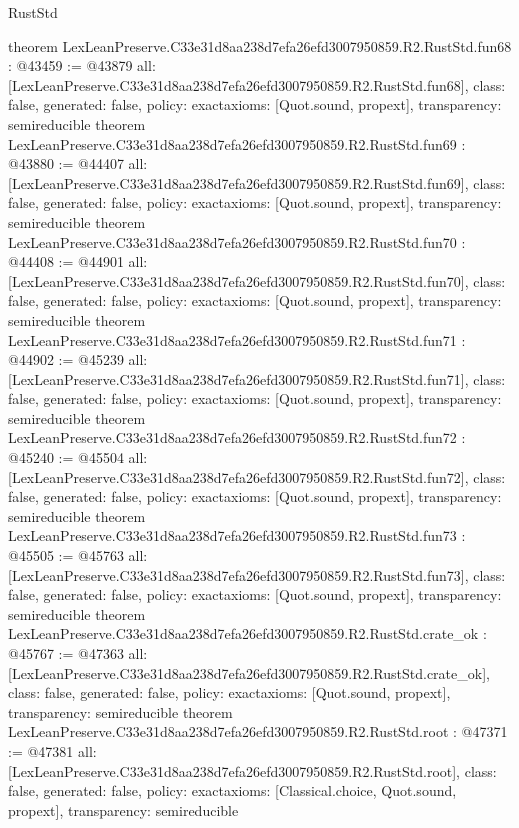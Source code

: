 \begin{lexlean}{RustStd}
\begin{coremodule}
{}
theorem LexLeanPreserve.C33e31d8aa238d7efa26efd3007950859.R2.RustStd.fun68 : @43459 := @43879 {
  all: [LexLeanPreserve.C33e31d8aa238d7efa26efd3007950859.R2.RustStd.fun68],
  class: false,
  generated: false,
  policy: exact{axioms: [Quot.sound, propext]},
  transparency: semireducible
}
theorem LexLeanPreserve.C33e31d8aa238d7efa26efd3007950859.R2.RustStd.fun69 : @43880 := @44407 {
  all: [LexLeanPreserve.C33e31d8aa238d7efa26efd3007950859.R2.RustStd.fun69],
  class: false,
  generated: false,
  policy: exact{axioms: [Quot.sound, propext]},
  transparency: semireducible
}
theorem LexLeanPreserve.C33e31d8aa238d7efa26efd3007950859.R2.RustStd.fun70 : @44408 := @44901 {
  all: [LexLeanPreserve.C33e31d8aa238d7efa26efd3007950859.R2.RustStd.fun70],
  class: false,
  generated: false,
  policy: exact{axioms: [Quot.sound, propext]},
  transparency: semireducible
}
theorem LexLeanPreserve.C33e31d8aa238d7efa26efd3007950859.R2.RustStd.fun71 : @44902 := @45239 {
  all: [LexLeanPreserve.C33e31d8aa238d7efa26efd3007950859.R2.RustStd.fun71],
  class: false,
  generated: false,
  policy: exact{axioms: [Quot.sound, propext]},
  transparency: semireducible
}
theorem LexLeanPreserve.C33e31d8aa238d7efa26efd3007950859.R2.RustStd.fun72 : @45240 := @45504 {
  all: [LexLeanPreserve.C33e31d8aa238d7efa26efd3007950859.R2.RustStd.fun72],
  class: false,
  generated: false,
  policy: exact{axioms: [Quot.sound, propext]},
  transparency: semireducible
}
theorem LexLeanPreserve.C33e31d8aa238d7efa26efd3007950859.R2.RustStd.fun73 : @45505 := @45763 {
  all: [LexLeanPreserve.C33e31d8aa238d7efa26efd3007950859.R2.RustStd.fun73],
  class: false,
  generated: false,
  policy: exact{axioms: [Quot.sound, propext]},
  transparency: semireducible
}
theorem LexLeanPreserve.C33e31d8aa238d7efa26efd3007950859.R2.RustStd.crate_ok : @45767 := @47363 {
  all: [LexLeanPreserve.C33e31d8aa238d7efa26efd3007950859.R2.RustStd.crate_ok],
  class: false,
  generated: false,
  policy: exact{axioms: [Quot.sound, propext]},
  transparency: semireducible
}
theorem LexLeanPreserve.C33e31d8aa238d7efa26efd3007950859.R2.RustStd.root : @47371 := @47381 {
  all: [LexLeanPreserve.C33e31d8aa238d7efa26efd3007950859.R2.RustStd.root],
  class: false,
  generated: false,
  policy: exact{axioms: [Classical.choice, Quot.sound, propext]},
  transparency: semireducible
}


\end{coremodule}
\end{lexlean}
